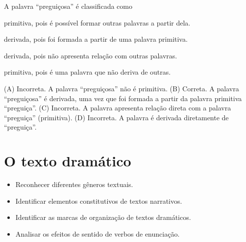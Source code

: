 A palavra ``preguiçosa'' é classificada como

\begin{escolha}
\item primitiva, pois é possível formar outras palavras a partir dela.

\item derivada, pois foi formada a partir de uma palavra primitiva.

\item derivada, pois não apresenta relação com outras palavras.

\item primitiva, pois é uma palavra que não deriva de outras.
\end{escolha}


(A) Incorreta. A palavra ``preguiçosa'' não é primitiva.
(B) Correta. A palavra ``preguiçosa'' é derivada, uma vez que foi
formada a partir da palavra primitiva ``preguiça''.
(C) Incorreta. A palavra apresenta relação direta com a palavra
``preguiça'' (primitiva).
(D) Incorreta. A palavra é derivada diretamente de ``preguiça''.

\chapter{O texto dramático}



\begin{itemize}
  \item Reconhecer diferentes gêneros textuais.
  \item Identificar elementos constitutivos de textos narrativos.
  \item Identificar as marcas de organização de textos dramáticos.
  \item Analisar os efeitos de sentido de verbos de enunciação.
\end{itemize}


